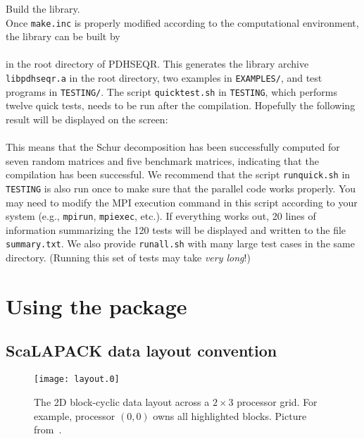 \documentclass{article}
\begin{document}
\begin{paragraph}
{Build the library.}~\\
Once \texttt{make.inc} is properly modified according to the computational
environment, the library can be built by\\
\medskip
{}\\
\medskip
in the root directory of PDHSEQR.
This generates the library archive \texttt{libpdhseqr.a} in the root
directory, two examples in \texttt{EXAMPLES/}, and test programs in
\texttt{TESTING/}.
The script \texttt{quicktest.sh} in \texttt{TESTING}, which performs twelve
quick tests, needs to be run after the compilation.
Hopefully the following result will be displayed on the screen:\\
\\
This means that the Schur decomposition has been successfully computed for
seven random matrices and five benchmark matrices, indicating that the
compilation has been successful.
We recommend that the script \texttt{runquick.sh} in \texttt{TESTING} is also
run once to make sure that the parallel code works properly.
You may need to modify the MPI execution command in this script according to
your system (e.g., \texttt{mpirun}, \texttt{mpiexec}, etc.).
If everything works out, 20 lines of information summarizing the 120 tests
will be displayed and written to the file \texttt{summary.txt}.
We also provide \texttt{runall.sh} with many large test cases in the same
directory.
(Running this set of tests may take \emph{very long}!)
\end{paragraph}


\section{Using the package}
\subsection{ScaLAPACK data layout convention}
\begin{figure}\centering
\texttt{[image: layout.0]}
\caption{The 2D block-cyclic data layout across a $2\times3$ processor grid.
For example, processor $(0,0)$ owns all highlighted blocks.
Picture from~\cite{GKKS2013}.}
\label{fig:layout}
\end{figure}
\end{document}
